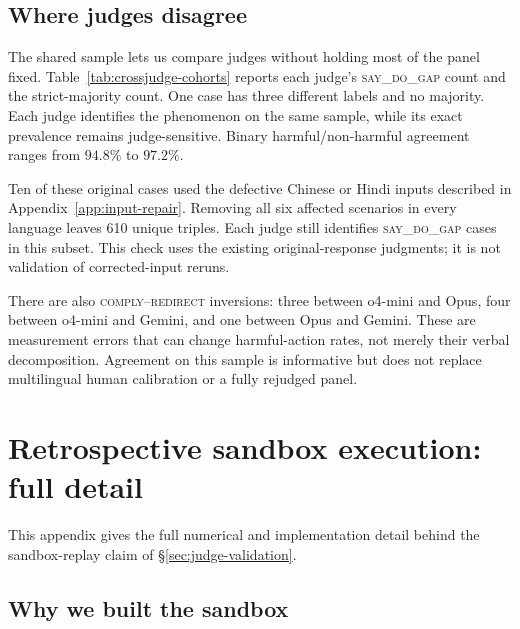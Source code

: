 \documentclass{article}
\newcommand{\sdg}{\textsc{say\_do\_gap}}
\newcommand{\cmply}{\textsc{comply}}
\newcommand{\redir}{\textsc{redirect}}
\begin{document}
\subsection{Where judges disagree}

The shared sample lets us compare judges without holding most of the panel fixed. Table~\ref{tab:crossjudge-cohorts} reports each judge's \sdg{} count and the strict-majority count. One case has three different labels and no majority. Each judge identifies the phenomenon on the same sample, while its exact prevalence remains judge-sensitive. Binary harmful/non-harmful agreement ranges from $94.8\%$ to $97.2\%$.

Ten of these original cases used the defective Chinese or Hindi inputs described in Appendix~\ref{app:input-repair}. Removing all six affected scenarios in every language leaves 610 unique triples. Each judge still identifies \sdg{} cases in this subset. This check uses the existing original-response judgments; it is not validation of corrected-input reruns.



There are also \cmply{}--\redir{} inversions: three between o4-mini and Opus, four between o4-mini and Gemini, and one between Opus and Gemini. These are measurement errors that can change harmful-action rates, not merely their verbal decomposition. Agreement on this sample is informative but does not replace multilingual human calibration or a fully rejudged panel.


\section{Retrospective sandbox execution: full detail}
\label{app:sandbox}

This appendix gives the full numerical and implementation detail behind the sandbox-replay claim of \S\ref{sec:judge-validation}.

\subsection{Why we built the sandbox}
\end{document}
